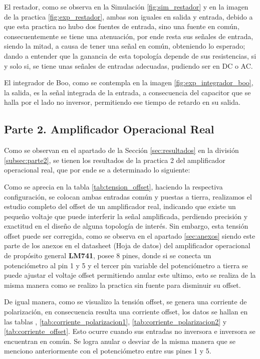         El restador, como se observa en la Simulación \ref{fig:sim_restador} y en la imagen de la practica \ref{fig:exp_restador}, ambas son iguales en salida y entrada, debido a que esta practica no hubo dos fuentes de entrada, sino una fuente en común, consecuentemente se tiene una atenuación, por ende resta sus señales de entrada, siendo la mitad, a causa de tener una señal en común, obteniendo lo esperado; dando a entender que la ganancia de esta topología depende de sus resistencias, si y solo si, se tiene unas señales de entradas adecuadas, pudiendo ser en DC o AC.

        El integrador de Boo, como se contempla en la imagen \ref{fig:exp_integrador_boo}, la salida, es la señal integrada de la entrada, a consecuencia del capacitor que se halla por el lado no inversor, permitiendo ese tiempo de retardo en su salida.
        

    \subsection{Parte 2. Amplificador Operacional Real}    

        Como se observan en el apartado de la Sección \ref{sec:resultados} en la división \ref{subsec:parte2}, se tienen los resultados de la practica 2 del amplificador operacional real, que por ende se a determinado lo siguiente:

        Como se aprecia en la tabla \ref{tab:tension_offset}, haciendo la respectiva configuración, se colocan ambas entradas común y puestas a tierra, realizamos el estudio completo del offset de un amplificador real, indicando que existe un pequeño voltaje que puede interferir la señal amplificada, perdiendo precisión y exactitud en el diseño de alguna topología de interés. Sin embargo, esta tensión offset puede ser corregida, como se observa en el apartado \ref{sec:anexos} siendo este parte de los anexos en el datasheet  (Hoja de datos) del amplificador operacional de propósito general \textbf{LM741}, posee 8 pines, donde si se conecta un potenciómetro al pin 1 y 5 y el tercer pin variable del potenciómetro a tierra se puede ajustar el voltaje offset permitiendo anular este ultimo, esto se realiza de la misma manera como se realizo la practica sin fuente para disminuir su offset. 

        De igual manera, como se visualizo la tensión offset, se genera una corriente de polarización, en consecuencia resulta una corriente offset, los datos se hallan en las tablas , \ref{tab:corriente_polarizacion1},  \ref{tab:corriente_polarizacion2} y \ref{tab:corriente_offset}. Esto ocurre cuando sus entradas no inversora e inversora se encuentran en común. Se logra anular o desviar de la misma manera que se menciono anteriormente con el potenciómetro entre sus pines 1 y 5. 

